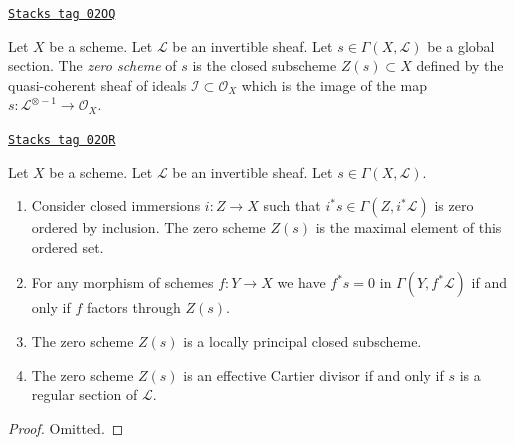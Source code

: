 \begin{definition}
\label{divisors-definition-zero-scheme-s}
\href{https://stacks.math.columbia.edu/tag/02OQ}{\texttt{Stacks tag 02OQ}}

Let $X$ be a scheme. Let $\mathcal{L}$ be an invertible sheaf.
Let $s \in \Gamma(X, \mathcal{L})$ be a global section.
The {\it zero scheme} of $s$ is the closed subscheme $Z(s) \subset X$
defined by the quasi-coherent sheaf of ideals
$\mathcal{I} \subset \mathcal{O}_X$ which is the image of the
map $s : \mathcal{L}^{\otimes -1} \to \mathcal{O}_X$.
\end{definition}

\begin{lemma}
\label{divisors-lemma-zero-scheme}
\href{https://stacks.math.columbia.edu/tag/02OR}{\texttt{Stacks tag 02OR}}

Let $X$ be a scheme.
Let $\mathcal{L}$ be an invertible sheaf.
Let $s \in \Gamma(X, \mathcal{L})$.
\begin{enumerate}
\item Consider closed immersions $i : Z \to X$ such that
$i^*s \in \Gamma(Z, i^*\mathcal{L})$ is zero
ordered by inclusion. The zero scheme $Z(s)$ is the
maximal element of this ordered set.
\item For any morphism of schemes $f : Y \to X$ we have
$f^*s = 0$ in $\Gamma(Y, f^*\mathcal{L})$ if and only if
$f$ factors through $Z(s)$.
\item The zero scheme $Z(s)$ is a locally principal closed subscheme.
\item The zero scheme $Z(s)$ is an effective Cartier divisor
if and only if $s$ is a regular section of $\mathcal{L}$.
\end{enumerate}
\end{lemma}

\begin{proof}
Omitted.
\end{proof}

